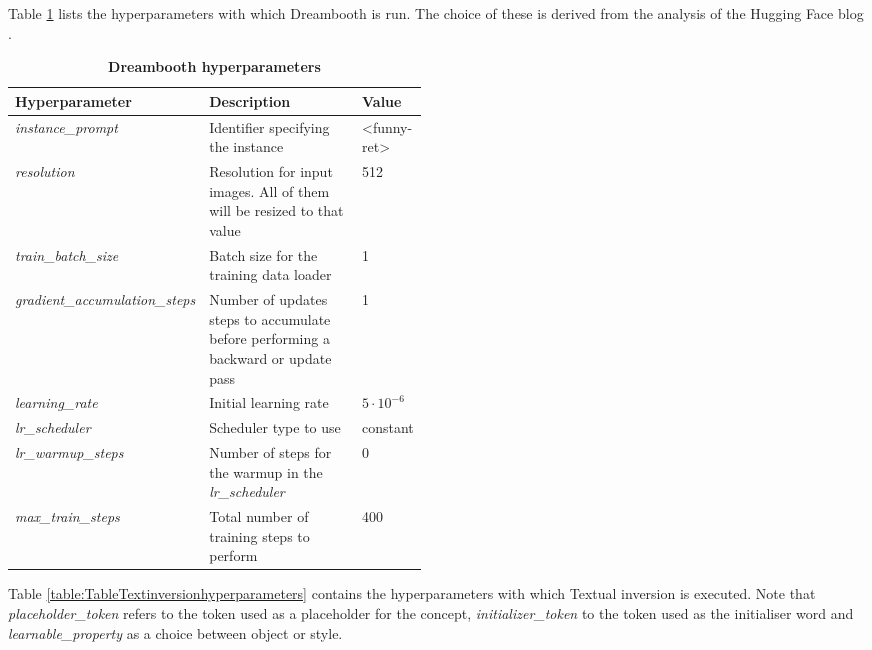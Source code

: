 Table \ref{table:TableDreamboothhyperparameters} lists the hyperparameters with which Dreambooth is run. The choice of these is derived from the analysis of the Hugging Face blog \cite{dreamboothdiffusers}.

\begin{table}[ht]
\centering
\begin{tabular}{|l|p{0.48\linewidth}|l|}
\hline
\rowcolor[HTML]{AEAAAA} 
\textbf{Hyperparameter} & \textbf{Description} & \textbf{Value} \\ \hline
\textit{instance\_prompt} & Identifier specifying the instance & \textless{}funny-ret\textgreater{} \\ \hline
\textit{resolution} & Resolution for input images. All of them will be resized to that value & 512 \\ \hline
\textit{train\_batch\_size} & Batch   size for the training data loader & 1 \\ \hline
\textit{gradient\_accumulation\_steps} & Number   of updates steps to accumulate before performing a backward or update pass & 1 \\ \hline
\textit{learning\_rate} & Initial learning rate & $5\cdot10^{-6}$ \\ \hline
\textit{lr\_scheduler} & Scheduler type to use & constant \\ \hline
\textit{lr\_warmup\_steps} & Number of steps for the warmup in the \textit{lr\_scheduler} & 0 \\ \hline
\textit{max\_train\_steps} & Total number of training steps to perform & 400 \\ \hline
\end{tabular}
\caption{\textbf{Dreambooth hyperparameters}}
\label{table:TableDreamboothhyperparameters}
\end{table}

Table \ref{table:TableTextinversionhyperparameters} contains the hyperparameters with which Textual inversion is executed. Note that \textit{placeholder\_token} refers to the token used as a placeholder for the concept, \textit{initializer\_token} to the token used as the initialiser word and \textit{learnable\_property} as a choice between object or style.

